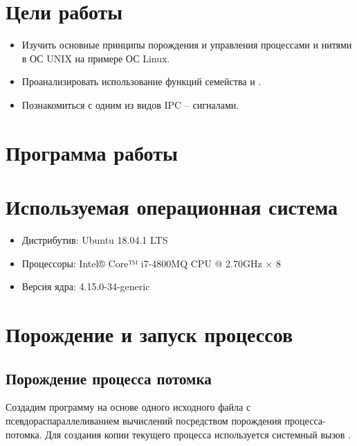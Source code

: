 





\tableofcontents
\newpage

\section{Цели работы}

\begin{itemize}
	\item Изучить основные принципы порождения и управления процессами и нитями в ОС UNIX на примере ОС Linux.
	\item Проанализировать использование функций семейства  и . 
	\item Познакомиться с одним из видов IPC -- сигналами.
\end{itemize}

\section{Программа работы}



\newpage

\section{Используемая операционная система}

\begin{itemize}
	\item Дистрибутив: Ubuntu 18.04.1 LTS
	\item Процессоры: Intel® Core™ i7-4800MQ CPU @ 2.70GHz × 8
	\item Версия ядра: 4.15.0-34-generic
\end{itemize}

\section{Порождение и запуск процессов}

\subsection{Порождение процесса потомка}

Создадим программу на основе одного исходного файла с псевдораспараллеливанием вычислений посредством порождения процесса-потомка. Для создания копии текущего процесса используется системный вызов .


